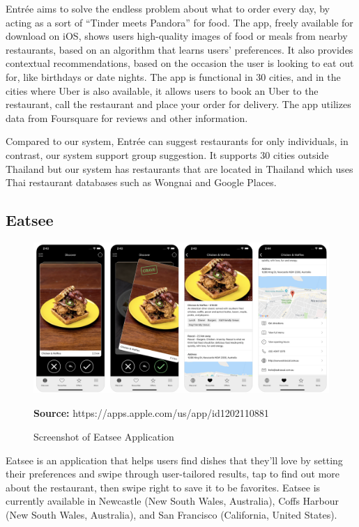 \documentclass[12pt,oneside,openright,a4paper]{cpe-english-project}
\newcommand*{\captionsource}[2]{%
  \caption[{#1}]{#1}\vspace{-8pt}
  \textbf{Source:} #2}
\begin{document}
Entrée aims to solve the endless problem about what to order every day, by acting as a sort of “Tinder meets Pandora” for food. The app, freely available for download on iOS, shows users high-quality images of food or meals from nearby restaurants, based on an algorithm that learns users’ preferences. It also provides contextual recommendations, based on the occasion the user is looking to eat out for, like birthdays or date nights. The app is functional in 30 cities, and in the cities where Uber is also available, it allows users to book an Uber to the restaurant, call the restaurant and place your order for delivery. The app utilizes data from Foursquare for reviews and other information. \cite{Entréechoosefromaworldofdisheswithasingletouch}

Compared to our system, Entrée can suggest restaurants for only individuals, in contrast, our system support group suggestion. It supports 30 cities outside Thailand but our system has restaurants that are located in Thailand which uses Thai restaurant databases such as Wongnai and Google Places.

\newpage
\subsection{Eatsee}

\begin{figure}[H]\centering
\includegraphics[width=400pt]{./images/2eatseereal.png}
\label{fig:2eatseereal}
\captionsource{Screenshot of Eatsee Application}{https://apps.apple.com/us/app/id1202110881}
\end{figure}\vspace{-24pt}
\vspace{1em}

Eatsee is an application that helps users find dishes that they’ll love by setting their preferences and swipe through user-tailored results, tap to find out more about the restaurant, then swipe right to save it to be favorites. Eatsee is currently available in Newcastle (New South Wales, Australia), Coffs Harbour (New South Wales, Australia), and San Francisco (California, United States). \cite{EatseeSeeitEatit}
\end{document}
